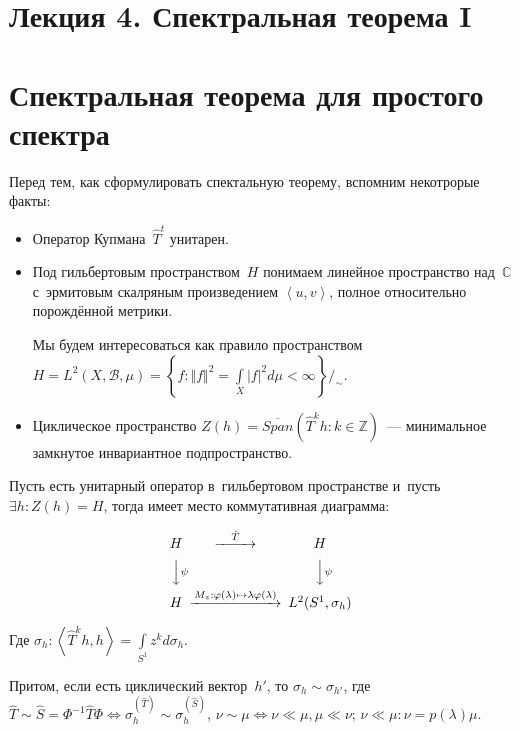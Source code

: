 \documentclass{article}
\begin{document}
\section*{Лекция 4. Спектральная теорема I}
\resetcntrs

\section{Спектральная теорема для простого спектра}

Перед тем, как сформулировать спектальную теорему, вспомним некотрорые факты:
\begin{itemize}
	\item Оператор Купмана~$\hat T^t$ унитарен.
	\item Под гильбертовым пространством~$H$ понимаем линейное пространство
		над~$\mathbb{C}$ с~эрмитовым скалряным произведением $\left< u, v \right>$,
		полное относительно порождённой метрики.

		Мы будем интересоваться как правило пространством~$H = L^2(X, \mathcal{B},
		\mu) = \left\{f: \Vert f \Vert^2 = \int\limits_X |f|^2 d\mu < \infty
		\right\} /_\sim$.
	\item Циклическое пространство $Z(h) = \overline{Span}(\hat T^k h: k \in
		\mathbb{Z})$~--- минимальное замкнутое инвариантное подпространство.
\end{itemize}

\begin{theorem}
	Пусть есть унитарный оператор в~гильбертовом пространстве и~пусть $\exists h:
	Z(h) = H$, тогда имеет место коммутативная диаграмма:

	$$\begin{CD}
	H           @>\hat T>>  H\\
	@VV\psi V              @VV\psi V\\
	H @> M_z: \phi(\lambda) \mapsto \lambda \phi(\lambda) >> L^2(S^1,\sigma_h)
	\end{CD}$$

	Где $\sigma_h: \left<\hat T^kh, h\right> = \int\limits_{S^1} z^k d\sigma_h$.

	Притом, если есть циклический вектор~$h'$, то $\sigma_h \sim \sigma_{h'}$, где
	$\hat T \sim \hat S = \Phi^{-1} \hat T \Phi \Leftrightarrow \sigma^{(\hat
	T)}_h \sim \sigma^{(\hat S)}_h$, $\nu \sim \mu \Leftrightarrow \nu \ll \mu,
	\mu \ll \nu$; $\nu \ll \mu: \nu = p(\lambda) \mu$.
\end{theorem}
\end{document}
